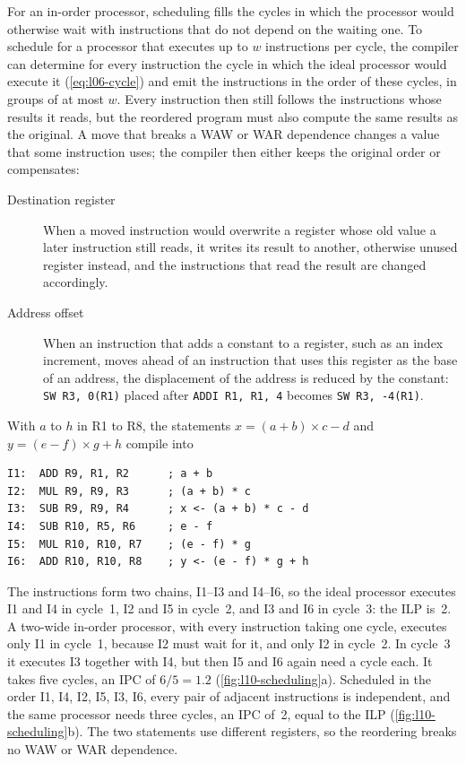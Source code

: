\documentclass[../main.tex]{subfiles}
\begin{document}
For an in-order processor, scheduling fills the cycles in which the processor
would otherwise wait with instructions that do not depend on the waiting one.
To schedule for a processor that executes up to $w$ instructions per cycle,
the compiler can determine for every instruction the cycle in which the ideal
processor would execute it (\cref{eq:l06-cycle}) and emit the instructions in
the order of these cycles, in groups of at most $w$.  Every instruction then
still follows the instructions whose results it reads, but the reordered
program must also compute the same results as the original.  A move that
breaks a WAW or WAR dependence changes a value that some instruction uses; the
compiler then either keeps the original order or compensates:
\begin{description}
  \item[Destination register] When a moved instruction would overwrite a
    register whose old value a later instruction still reads, it writes its
    result to another, otherwise unused register instead, and the instructions
    that read the result are changed accordingly.
  \item[Address offset] When an instruction that adds a constant to a
    register, such as an index increment, moves ahead of an instruction that
    uses this register as the base of an address, the displacement of the
    address is reduced by the constant: \texttt{SW R3, 0(R1)} placed after
    \texttt{ADDI R1, R1, 4} becomes \texttt{SW R3, -4(R1)}.
\end{description}

\begin{example}
  \label{ex:l10-scheduling}
  With $a$ to $h$ in R1 to R8, the statements $x = (a+b)\times c - d$ and
  $y = (e-f)\times g + h$ compile into
  \begin{lstlisting}[language={[x86masm]Assembler}, numbers=none]
I1:  ADD R9, R1, R2      ; a + b
I2:  MUL R9, R9, R3      ; (a + b) * c
I3:  SUB R9, R9, R4      ; x <- (a + b) * c - d
I4:  SUB R10, R5, R6     ; e - f
I5:  MUL R10, R10, R7    ; (e - f) * g
I6:  ADD R10, R10, R8    ; y <- (e - f) * g + h
\end{lstlisting}
  The instructions form two chains, I1--I3 and I4--I6, so the ideal processor
  executes I1 and I4 in cycle~1, I2 and I5 in cycle~2, and I3 and I6 in
  cycle~3: the ILP is~2.  A two-wide in-order processor, with every instruction
  taking one cycle, executes only I1 in cycle~1, because I2 must wait for it, and only I2 in cycle~2.  In cycle~3 it
  executes I3 together with I4, but then I5 and I6 again need a cycle each.
  It takes five cycles, an IPC of $6/5 = 1.2$
  (\cref{fig:l10-scheduling}a).  Scheduled in the order I1, I4, I2, I5, I3,
  I6, every pair of adjacent instructions is independent, and the same
  processor needs three cycles, an IPC of~2, equal to the ILP
  (\cref{fig:l10-scheduling}b).  The two statements use different registers,
  so the reordering breaks no WAW or WAR dependence.
\end{example}
\end{document}
